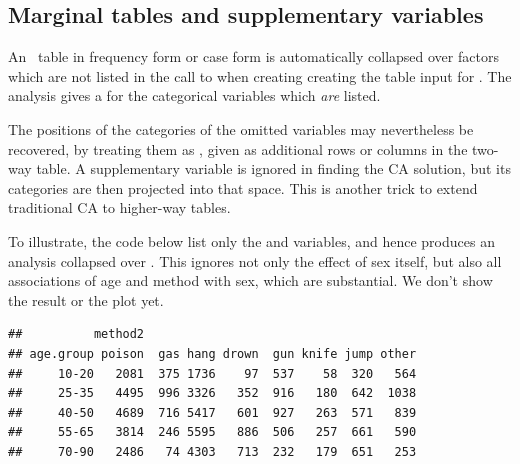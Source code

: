 \documentclass[11pt]{book}
\renewenvironment{knitrout}{\small\renewcommand{\baselinestretch}{.85}}{} %
\begin{document}

\subsection{Marginal tables and supplementary variables}\label{ca:marginal}

An \nway\ table in frequency form or case form is automatically collapsed
over factors which are not listed in the 
call to  when creating creating the table input for .
The analysis gives a  for the categorical variables which
\emph{are} listed.  

The positions of the categories of the omitted variables
may nevertheless be recovered, by treating them as ,
given as additional rows or columns in the two-way table.
A supplementary variable is ignored in finding the CA solution,
but its categories are then projected into that space.  
This is another trick to extend traditional CA to higher-way tables.

To illustrate, the code below list only the 
and  variables, and hence produces an analysis
collapsed over .
This ignores not only the effect of sex itself,
but also all associations of age and method with sex,
which are substantial. We don't show the  result
or the plot yet.

\begin{knitrout}
\color{fgcolor}\begin{kframe}
\begin{alltt}
 \hlkwb{<-}  \hlopt{~}  \hlopt{+}  
\end{alltt}
\begin{verbatim}
##          method2
## age.group poison  gas hang drown  gun knife jump other
##     10-20   2081  375 1736    97  537    58  320   564
##     25-35   4495  996 3326   352  916   180  642  1038
##     40-50   4689  716 5417   601  927   263  571   839
##     55-65   3814  246 5595   886  506   257  661   590
##     70-90   2486   74 4303   713  232   179  651   253
\end{verbatim}
\begin{alltt}
 \hlkwb{<-} 
\end{alltt}
\end{kframe}
\end{knitrout}
\end{document}
